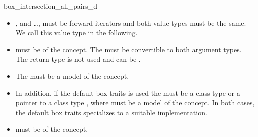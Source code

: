 \begin{ccRefFunction}{box_intersection_all_pairs_d}

\ccRequirements

\begin{itemize}
  \item
    , and \ldots {}, must be
    forward iterators and both value types must be
    the same. We call this value type  in the following.
  \item
     must be of the  concept. 
    The  must be convertible to both argument types. The
    return type is not used and can be .
  \item
    The  must be a model of the  concept.
  \item
    In addition, if the default box traits is used the  must 
    be a class type  or a pointer to a class type , where
     must be a model of the  concept.
    In both cases, the default box traits specializes to a suitable
    implementation.
  \item
     must be of the  concept.
\end{itemize}


\end{ccRefFunction}
